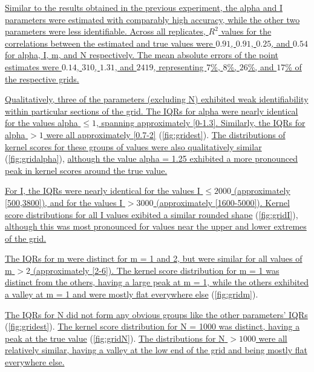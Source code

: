 {\color{blue}\uline{Similar to the results obtained in the previous experiment,
the \gls{alpha} and \gls{I} parameters were estimated with comparably high
accuracy, while the other two parameters were less identifiable. Across all
replicates, $R^2$ values for the correlations between the estimated and true
values were
    $0.91$,
    $0.91$,
    $0.25$, and
    $0.54$
for \gls{alpha}, \gls{I}, \gls{m}, and \gls{N} respectively. The mean absolute
errors of the point estimates were
    $0.14$,
    $310$,
    $1.31$, and
    $2419$,
representing
    $7$\%,
    $8$\%,
    $26$\%, and
    $17$\%
of the respective grids.}

\uline{Qualitatively, three of the parameters (excluding \gls{N}) exhibited
weak identifiability within particular sections of the grid. The \glspl{IQR}
for \gls{alpha} were nearly identical for the values \gls{alpha} $\leq 1$,
spanning approximately [0-1.3]. Similarly, the \glspl{IQR} for \gls{alpha} $>
1$ were all approximately [0.7-2]} (\cref{fig:gridest}). \uline{The
distributions of kernel scores for these groups of values were also
qualitatively similar} (\cref{fig:gridalpha}), \uline{although the value
\gls{alpha} = 1.25 exhibited a more pronounced peak in kernel scores around the
true value.}

\uline{For \gls{I}, the \glspl{IQR} were nearly identical for the values
\gls{I} $\leq 2000$ (approximately [500,3800]), and for the values \gls{I} $>
3000$ (approximately [1600-5000]). Kernel score distributions for all \gls{I}
values exibited a similar rounded shape} (\cref{fig:gridI}), \uline{although
this was most pronounced for values near the upper and lower extremes of the
grid.}

\uline{The \glspl{IQR} for \gls{m} were distinct for \gls{m} = 1 and 2, but
were similar for all values of \gls{m} $> 2$ (approximately [2-6]). The kernel
score distribution for \gls{m} = 1 was distinct from the others, having a large
peak at \gls{m} = 1, while the others exhibited a valley at \gls{m} = 1 and
were mostly flat everywhere else} (\cref{fig:gridm}). 

\uline{The \glspl{IQR} for \gls{N} did not form any obvious groups like the
other parameters' \glspl{IQR}} (\cref{fig:gridest}). \uline{The kernel score
distribution for \gls{N} = 1000 was distinct, having a peak at the true value}
(\cref{fig:gridN}). \uline{The distributions for \gls{N} $> 1000$ were all
relatively similar, having a valley at the low end of the grid and being mostly 
flat everywhere else.}}

